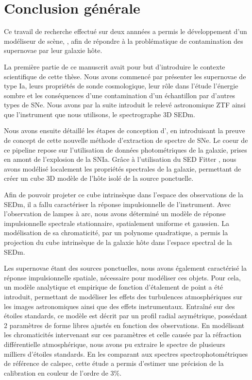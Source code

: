 \documentclass[../main/main.tex]{subfiles}
\begin{document}
\chapter*{Conclusion générale}\label{cp:conclusions}
\vspace{1cm}

Ce travail de recherche effectué sur deux annnées a permis le développement
d'un modéliseur de scène, \hypergal, afin de répondre à la
problématique de contamination des supernovae par leur galaxie hôte.

La première partie de ce manuscrit avait pour but d'introduire le
contexte scientifique de cette thèse. Nous avons commencé par présenter les
supernovae de type Ia, leurs propriétés de sonde cosmologique, leur rôle dans
l'étude l'énergie sombre et les conséquences d'une contamination d'un
échantillon par d'autres types de SNe. Nous avons par la suite introduit
le relevé astronomique ZTF ainsi que l'instrument que nous utilisons, le
spectrographe 3D SEDm.

Nous avons ensuite détaillé les étapes de conception d'\hypergal, en
introduisant la preuve de concept de cette nouvelle méthode d'extraction
de spectre de SNe.
Le coeur de ce pipeline repose sur l’utilisation de
données photométriques de la galaxie, prises en amont de
l’explosion de la SNIa. Grâce à l'utilisation du SED Fitter
, nous avons modélisé localement les propriétés spectrales
de la galaxie, permettant de créer un cube 3D modèle de l'hôte isolé de
la source ponctuelle.

Afin de pouvoir projeter ce cube intrinsèque dans l'espace des
observations de la SEDm, il a fallu caractériser la réponse
impulsionnelle de l'instrument. Avec l'observation de
lampes à arc, nous avons déterminé un modèle de
réponse impulsionnelle spectrale stationnaire, spatialement uniforme et
gaussien. La modélisation de sa chromaticité,
par un polynome quadratique,
a permis la projection du cube intrinsèque de la galaxie hôte dans
l'espace spectral de la SEDm.

Les supernovae étant des sources ponctuelles, nous avons également
caractérisé la réponse impulsionnelle
spatiale, nécessaire pour modéliser ces objets. Pour cela, un modèle analytique et empirique de fonction
d'étalement de point a été introduit, permettant de modéliser les effets
des turbulences atmosphériques sur les images astronomiques ainsi que des
effets instrumentaux. Entraîné sur des étoiles standards,
ce modèle est décrit par un profil radial asymétrique, possédant 2
paramètres de forme libres ajustés en
fonction des observations. En modélisant les chromaticités
intervenant sur ces paramètres et celle causée par la réfraction
différentielle atmosphérique, nous avons pu extraire le spectre de
plusieurs milliers d'étoiles standards. En les comparant aux spectres
spectrophotométriques de référence de calspec, cette étude a permis d'estimer
une précision de la calibration en couleur de l'ordre de $3\%$.
\end{document}

